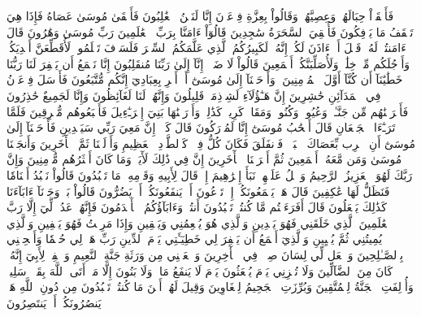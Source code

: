 فَأَلۡقَوۡاْ حِبَالَهُمۡ وَعِصِيَّهُمۡ وَقَالُواْ بِعِزَّةِ فِرۡعَوۡنَ إِنَّا لَنَحۡنُ ٱلۡغَٰلِبُونَ
فَأَلۡقَىٰ مُوسَىٰ عَصَاهُ فَإِذَا هِيَ تَلۡقَفُ مَا يَأۡفِكُونَ
فَأُلۡقِيَ ٱلسَّحَرَةُ سَٰجِدِينَ
قَالُوٓاْ ءَامَنَّا بِرَبِّ ٱلۡعَٰلَمِينَ
رَبِّ مُوسَىٰ وَهَٰرُونَ
قَالَ ءَامَنتُمۡ لَهُۥ قَبۡلَ أَنۡ ءَاذَنَ لَكُمۡۖ إِنَّهُۥ لَكَبِيرُكُمُ ٱلَّذِي عَلَّمَكُمُ ٱلسِّحۡرَ فَلَسَوۡفَ تَعۡلَمُونَۚ لَأُقَطِّعَنَّ أَيۡدِيَكُمۡ وَأَرۡجُلَكُم مِّنۡ خِلَٰفٖ وَلَأُصَلِّبَنَّكُمۡ أَجۡمَعِينَ
قَالُواْ لَا ضَيۡرَۖ إِنَّآ إِلَىٰ رَبِّنَا مُنقَلِبُونَ
إِنَّا نَطۡمَعُ أَن يَغۡفِرَ لَنَا رَبُّنَا خَطَٰيَٰنَآ أَن كُنَّآ أَوَّلَ ٱلۡمُؤۡمِنِينَ
۞وَأَوۡحَيۡنَآ إِلَىٰ مُوسَىٰٓ أَنۡ أَسۡرِ بِعِبَادِيٓ إِنَّكُم مُّتَّبَعُونَ
فَأَرۡسَلَ فِرۡعَوۡنُ فِي ٱلۡمَدَآئِنِ حَٰشِرِينَ
إِنَّ هَـٰٓؤُلَآءِ لَشِرۡذِمَةٞ قَلِيلُونَ
وَإِنَّهُمۡ لَنَا لَغَآئِظُونَ
وَإِنَّا لَجَمِيعٌ حَٰذِرُونَ
فَأَخۡرَجۡنَٰهُم مِّن جَنَّـٰتٖ وَعُيُونٖ
وَكُنُوزٖ وَمَقَامٖ كَرِيمٖ
كَذَٰلِكَۖ وَأَوۡرَثۡنَٰهَا بَنِيٓ إِسۡرَـٰٓءِيلَ
فَأَتۡبَعُوهُم مُّشۡرِقِينَ
فَلَمَّا تَرَـٰٓءَا ٱلۡجَمۡعَانِ قَالَ أَصۡحَٰبُ مُوسَىٰٓ إِنَّا لَمُدۡرَكُونَ
قَالَ كَلَّآۖ إِنَّ مَعِيَ رَبِّي سَيَهۡدِينِ
فَأَوۡحَيۡنَآ إِلَىٰ مُوسَىٰٓ أَنِ ٱضۡرِب بِّعَصَاكَ ٱلۡبَحۡرَۖ فَٱنفَلَقَ فَكَانَ كُلُّ فِرۡقٖ كَٱلطَّوۡدِ ٱلۡعَظِيمِ
وَأَزۡلَفۡنَا ثَمَّ ٱلۡأٓخَرِينَ
وَأَنجَيۡنَا مُوسَىٰ وَمَن مَّعَهُۥٓ أَجۡمَعِينَ
ثُمَّ أَغۡرَقۡنَا ٱلۡأٓخَرِينَ
إِنَّ فِي ذَٰلِكَ لَأٓيَةٗۖ وَمَا كَانَ أَكۡثَرُهُم مُّؤۡمِنِينَ
وَإِنَّ رَبَّكَ لَهُوَ ٱلۡعَزِيزُ ٱلرَّحِيمُ
وَٱتۡلُ عَلَيۡهِمۡ نَبَأَ إِبۡرَٰهِيمَ
إِذۡ قَالَ لِأَبِيهِ وَقَوۡمِهِۦ مَا تَعۡبُدُونَ
قَالُواْ نَعۡبُدُ أَصۡنَامٗا فَنَظَلُّ لَهَا عَٰكِفِينَ
قَالَ هَلۡ يَسۡمَعُونَكُمۡ إِذۡ تَدۡعُونَ
أَوۡ يَنفَعُونَكُمۡ أَوۡ يَضُرُّونَ
قَالُواْ بَلۡ وَجَدۡنَآ ءَابَآءَنَا كَذَٰلِكَ يَفۡعَلُونَ
قَالَ أَفَرَءَيۡتُم مَّا كُنتُمۡ تَعۡبُدُونَ
أَنتُمۡ وَءَابَآؤُكُمُ ٱلۡأَقۡدَمُونَ
فَإِنَّهُمۡ عَدُوّٞ لِّيٓ إِلَّا رَبَّ ٱلۡعَٰلَمِينَ
ٱلَّذِي خَلَقَنِي فَهُوَ يَهۡدِينِ
وَٱلَّذِي هُوَ يُطۡعِمُنِي وَيَسۡقِينِ
وَإِذَا مَرِضۡتُ فَهُوَ يَشۡفِينِ
وَٱلَّذِي يُمِيتُنِي ثُمَّ يُحۡيِينِ
وَٱلَّذِيٓ أَطۡمَعُ أَن يَغۡفِرَ لِي خَطِيٓـَٔتِي يَوۡمَ ٱلدِّينِ
رَبِّ هَبۡ لِي حُكۡمٗا وَأَلۡحِقۡنِي بِٱلصَّـٰلِحِينَ
وَٱجۡعَل لِّي لِسَانَ صِدۡقٖ فِي ٱلۡأٓخِرِينَ
وَٱجۡعَلۡنِي مِن وَرَثَةِ جَنَّةِ ٱلنَّعِيمِ
وَٱغۡفِرۡ لِأَبِيٓ إِنَّهُۥ كَانَ مِنَ ٱلضَّآلِّينَ
وَلَا تُخۡزِنِي يَوۡمَ يُبۡعَثُونَ
يَوۡمَ لَا يَنفَعُ مَالٞ وَلَا بَنُونَ
إِلَّا مَنۡ أَتَى ٱللَّهَ بِقَلۡبٖ سَلِيمٖ
وَأُزۡلِفَتِ ٱلۡجَنَّةُ لِلۡمُتَّقِينَ
وَبُرِّزَتِ ٱلۡجَحِيمُ لِلۡغَاوِينَ
وَقِيلَ لَهُمۡ أَيۡنَ مَا كُنتُمۡ تَعۡبُدُونَ
مِن دُونِ ٱللَّهِ هَلۡ يَنصُرُونَكُمۡ أَوۡ يَنتَصِرُونَ
